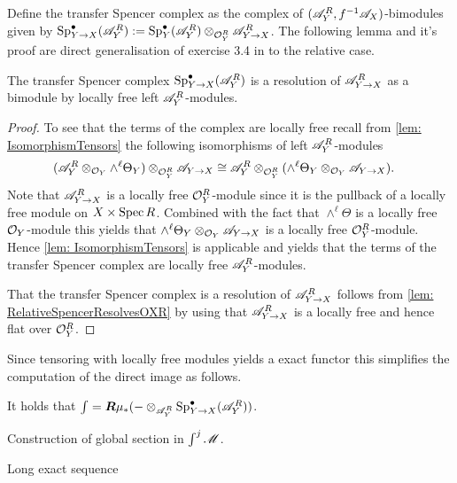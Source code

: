     Define the transfer Spencer complex as the complex of  $(\mathscr{A}_Y^R,f^{-1}\mathscr{A}_X)$-bimodules given by $\operatorname{Sp}^\bullet_{Y\to X}(\mathscr{A}_Y^R) := \operatorname{Sp}^\bullet_Y(\mathscr{A}_Y^R) \otimes_{\mathcal{O}_Y^R}\mathscr{A}_{Y \to X}^R$.
    The following lemma and it's proof are direct generalisation of exercise 3.4 in \cite{sabbah2011introduction} to the relative case.
    \begin{lemma}\label{lem: SpencerResolutionTransferModule}
      The transfer Spencer complex $\operatorname{Sp}^\bullet_{Y\to X}(\mathscr{A}_Y^R)$ is a resolution of $\mathscr{A}_{Y\to X}^R$ as a bimodule by locally free left $\mathscr{A}_Y^R$-modules.
    \end{lemma}
    \begin{proof}
       To see that the terms of the complex are locally free recall from \cref{lem: IsomorphismTensors} the following isomorphisms of left $\mathscr{A}_Y^R$-modules
        \begin{align*}
           (\mathscr{A}_Y^R \otimes_{\mathcal{O}_Y} \wedge^\ell\Theta_Y )\otimes_{\mathcal{O}_Y^R}\mathscr{A}_{Y\to X} &
           \cong \mathscr{A}_Y^R \otimes_{\mathcal{O}_Y^R}(  \wedge^\ell\Theta_Y \otimes_{\mathcal{O}_Y}\mathscr{A}_{Y\to X}).
        \end{align*}
      Note that $\mathscr{A}_{Y\to X}^R$ is a locally free $\mathcal{O}_Y^R$-module since it is the pullback of a locally free module on $X\times \operatorname{Spec} R$.
      Combined with the fact that $\wedge^\ell \Theta$ is a locally free $\mathcal{O}_Y$-module this yields that $ \wedge^\ell\Theta_Y \otimes_{\mathcal{O}_Y}\mathscr{A}_{Y\to X}$ is a locally free $\mathcal{O}_Y^R$-module.
      Hence \cref{lem: IsomorphismTensors} is applicable and yields that the terms of the transfer Spencer complex are locally free $\mathscr{A}_Y^R$-modules.

      That the transfer Spencer complex is a resolution of $\mathscr{A}_{Y\to X}^R$ follows from \cref{lem: RelativeSpencerResolvesOXR} by using that $\mathscr{A}_{Y\to X}^R$ is a locally free and hence flat over $\mathcal{O}_Y^R$.
    \end{proof}


    Since tensoring with locally free modules yields a exact functor this simplifies the computation of the direct image as follows.
    \begin{corollary}
        It holds that $\int = \boldsymbol{R}\mu_* ({-}\otimes_{\mathscr{A}_Y^R} \operatorname{Sp}_{Y\to X}^\bullet(\mathscr{A}_Y^R))$.
    \end{corollary}
    \begin{lemma}
        Construction of global section in $\int^j \mathscr{M}$.
    \end{lemma}
    \begin{theorem}
      Long exact sequence
    \end{theorem}
